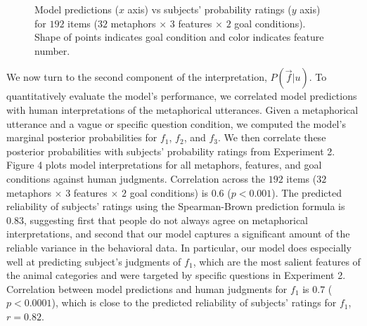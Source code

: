 \documentclass[10pt,letterpaper]{article}
\begin{document}
\begin{figure}[t]
\begin{center}
\end{center}
\caption{Model predictions ($x$ axis) vs subjects' probability ratings ($y$ axis) for $192$ items ($32$ metaphors $\times$ $3$ features $\times$ $2$ goal conditions). Shape of points indicates goal condition and color indicates feature number.} 
\label{scatter_full}
\end{figure}

We now turn to the second component of the interpretation, $P(\vec f | u)$. 
To quantitatively evaluate the model's performance, we correlated model predictions with human interpretations of the metaphorical utterances. Given a metaphorical utterance and a vague or specific question condition, we computed the model's marginal posterior probabilities for $f_1$, $f_2$, and $f_3$. We then correlate these posterior probabilities with subjects' probability ratings from Experiment 2. Figure 4 plots model interpretations for all metaphors, features, and goal conditions against human judgments. Correlation across the $192$ items ($32$ metaphors $\times$ $3$ features $\times$ $2$ goal conditions) is $0.6$ ($p < 0.001$). The predicted reliability of subjects' ratings using the Spearman-Brown prediction formula is $0.83$, suggesting first that people do not always agree on metaphorical interpretations, and second that our model captures a significant amount of the reliable variance in the behavioral data. In particular, our model does especially well at predicting subject's judgments of $f_1$, which are the most salient features of the animal categories and were targeted by specific questions in Experiment 2. Correlation between model predictions and human judgments for $f_1$ is $0.7$ ($p < 0.0001$), which is close to the predicted reliability of subjects' ratings for $f_1$, $r=0.82$. 
\end{document}
